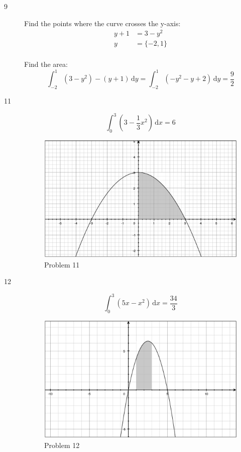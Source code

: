 \documentclass{exam}
\begin{document}
\begin{description}
\item[9]
Find the points where the curve crosses the y-axis:
\begin{align*}
  y + 1 &= 3 - y^2 \\
  y &= \{-2, 1\} \\
\end{align*}

Find the area:
\[
  \int_{-2}^1 (3 - y^2) - (y + 1) \, \mathrm{d}y = \int_{-2}^1 (-y^2 - y + 2) \, \mathrm{d}y = \frac{9}{2}
\]

\item[11]
\[
  \int_0^3 \left(3 - \frac{1}{3} x^2 \right) \, \mathrm{d}x = 6
\]

\begin{figure}[H]
  \centering
  \includegraphics[scale=.3]{problem_11.eps}
  \caption*{Problem 11}
\end{figure}

\item[12]
\[
  \int_0^3 \left(5x - x^2 \right) \, \mathrm{d}x = \frac{34}{3}
\] 

\begin{figure}[H]
  \centering
  \includegraphics[scale=.3]{problem_12.eps}
  \caption*{Problem 12}
\end{figure}


\end{description}
\end{document}
